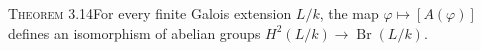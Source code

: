 \noindent\textsc{Theorem 3.14}\quad For every finite Galois extension $L/k$, the map $\varphi\mapsto[A(\varphi)]$ defines an isomorphism of abelian groups $H^2(L/k)\to\operatorname{Br}(L/k)$.
